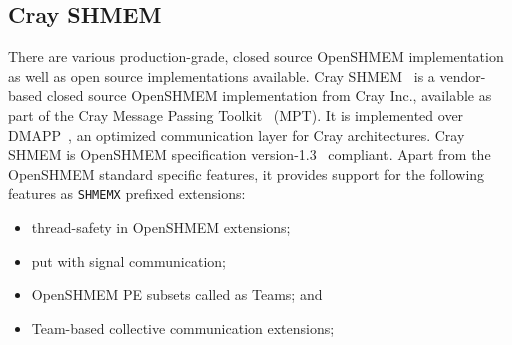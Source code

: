 \subsection{Cray SHMEM}
\label{src:bg/crayshmem}
There are various production-grade, closed source OpenSHMEM implementation as well
as open source implementations available. Cray SHMEM~\cite{csma} is a vendor-based
closed source OpenSHMEM implementation from Cray Inc., available as part of the Cray
Message Passing Toolkit~\cite{mpt} (MPT). It is implemented over DMAPP~\cite{dmapp},
an optimized communication layer for Cray architectures. Cray SHMEM is OpenSHMEM
specification version-1.3~\cite{osm13} compliant. Apart from the OpenSHMEM standard
specific features, it provides support for the following features as \texttt{SHMEMX}
prefixed extensions:
\begin{itemize}
    \item thread-safety in OpenSHMEM extensions;
    \item put with signal communication;
    \item OpenSHMEM PE subsets called as Teams; and
    \item Team-based collective communication extensions;
\end{itemize}
